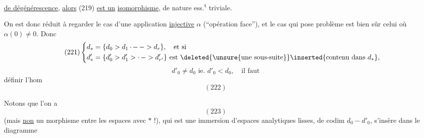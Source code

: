 \uline{de dégénérescence}, \uline{alors} (219) \uline{est un}
\uline{isomorphisme}, de nature ess.\textsuperscript{t} triviale.

On est donc réduit à regarder le
cas d'une application \uline{injective} $\alpha$ (``opération
face''), et le  cas qui  pose problème
est bien sûr celui où $\alpha(0)\ne0$. Donc
\[
\tag{221}
\left\{\begin{aligned}
d_*&=\{d_0>d_1\mathinner{\cdot\,{-}\,{-}}>d_r\},\quad\text{et si}\\
d'_*&=\{d'_0>d'_1>\mathinner{\cdot\,{-}}>d'_{r'}\}\text{ est }
\text{\deleted{\unsure{une sous-suite}}}\inserted{\text{contenu dans }d_*},
\end{aligned}\right.
\]
\[
d'_0\ne d_0\text{ ie. }d'_0<d_0,\quad\text{il faut}
\]
définir l'hom
\[
(222)
\]

Notons que l'on a
\[
(223)
\]
(mais \uline{non} un morphisme entre les
espaces avec $*$ !), qui est une immersion 
d'espaces analytiques lisses, de codim
$d_0-d'_0$,  s'insère dans le diagramme

